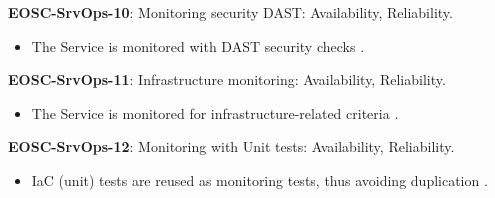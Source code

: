\textbf{EOSC-SrvOps-10}: Monitoring security DAST: Availability, Reliability.

\begin{itemize}
    \item The Service is monitored with DAST security checks \cite{orviz_fernandez_eosc-synergy_2020}.
\end{itemize}

\textbf{EOSC-SrvOps-11}: Infrastructure monitoring: Availability, Reliability.

\begin{itemize}
    \item The Service is monitored for infrastructure-related criteria \cite{orviz_fernandez_eosc-synergy_2020}.
\end{itemize}

\textbf{EOSC-SrvOps-12}: Monitoring with Unit tests: Availability, Reliability.

\begin{itemize}
    \item IaC (unit) tests are reused as monitoring tests, thus avoiding duplication \cite{orviz_fernandez_eosc-synergy_2020}.
\end{itemize}

